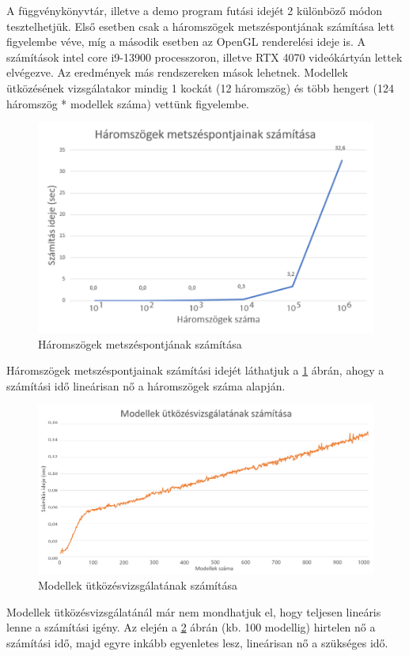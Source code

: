 A függvénykönyvtár, illetve a demo program futási idejét 2 különböző módon tesztelhetjük. Első esetben csak a háromszögek metszéspontjának számítása lett figyelembe véve, míg a második esetben az OpenGL \cite{OpenGL} renderelési ideje is.
A számítások intel core i9-13900 processzoron, illetve RTX 4070 videókártyán lettek elvégezve. Az eredmények más rendszereken mások lehetnek. Modellek ütközésének vizsgálatakor mindig 1 kockát (12 háromszög) és több hengert (124 háromszög * modellek száma) vettünk figyelembe.
\begin{figure}[h]
	\centering
	\includegraphics[width=15truecm, height=9truecm]{images/háromszögek_száma.png}
	\caption{Háromszögek metszéspontjának számítása}
	\label{fig:szam_1}
\end{figure}

Háromszögek metszéspontjainak számítási idejét láthatjuk a \ref{fig:szam_1} ábrán, ahogy a számítási idő lineárisan nő a háromszögek száma alapján.

\newpage

\begin{figure}[h]
	\centering
	\includegraphics[width=15truecm, height=9truecm]{images/modellek_számítása.png}
	\caption{Modellek ütközésvizsgálatának számítása}
	\label{fig:szam_2}
\end{figure}

Modellek ütközésvizsgálatánál már nem mondhatjuk el, hogy teljesen lineáris lenne a számítási igény. Az elején a \ref{fig:szam_2} ábrán (kb. 100 modellig) hirtelen nő a számítási idő, majd egyre inkább egyenletes lesz, lineárisan nő a szükséges idő.